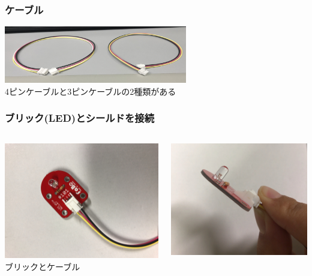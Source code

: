 \begin{frame}
    \frametitle{ケーブル}
    \begin{center}
        \includegraphics[width=0.6\textwidth]{images/chap05/text05-img013.png}
        \vspace{3pt}
        {\\4ピンケーブルと3ピンケーブルの2種類がある}
    \end{center}
\end{frame}

\begin{frame}
    \frametitle{ブリック(LED)とシールドを接続} 
    \begin{columns}
        \begin{column}{0.48\textwidth}
            \includegraphics[width=\textwidth]{images/chap05/text05-img008.jpg} 
            {ブリックとケーブル}
        \end{column}
        \begin{column}{0.48\textwidth}
            \includegraphics[width=\textwidth]{images/chap05/text05-img011.jpg} 

\end{column}
\end{columns}
\end{frame}

